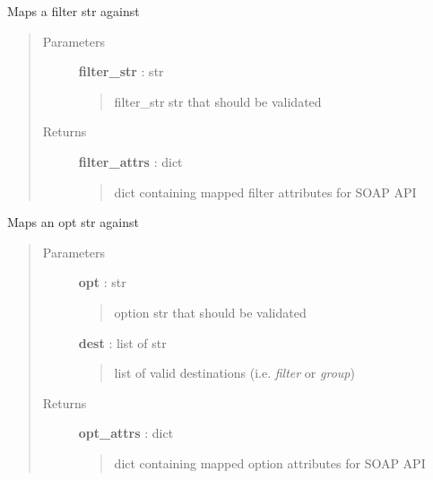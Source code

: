 \documentclass[letterpaper,10pt,english]{sphinxmanual}
\begin{document}

\begin{fulllineitems}
\label{pytan.utils:pytan.utils.map_filter}
Maps a filter str against 
\begin{quote}\begin{description}
\item[{Parameters}] \leavevmode
\textbf{filter\_str} : str
\begin{quote}

filter\_str str that should be validated
\end{quote}

\item[{Returns}] \leavevmode
\textbf{filter\_attrs} : dict
\begin{quote}

dict containing mapped filter attributes for SOAP API
\end{quote}

\end{description}\end{quote}

\end{fulllineitems}


\begin{fulllineitems}
\label{pytan.utils:pytan.utils.map_option}
Maps an opt str against 
\begin{quote}\begin{description}
\item[{Parameters}] \leavevmode
\textbf{opt} : str
\begin{quote}

option str that should be validated
\end{quote}

\textbf{dest} : list of str
\begin{quote}

list of valid destinations (i.e. \emph{filter} or \emph{group})
\end{quote}

\item[{Returns}] \leavevmode
\textbf{opt\_attrs} : dict
\begin{quote}

dict containing mapped option attributes for SOAP API
\end{quote}

\end{description}\end{quote}

\end{fulllineitems}
\end{document}

